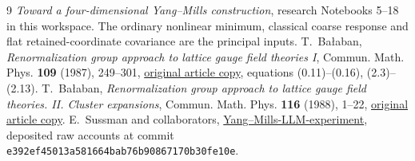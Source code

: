 \documentclass[11pt]{article}
\theoremstyle{remark}
\begin{document}
\begin{thebibliography}{9}
\emph{Toward a four-dimensional Yang--Mills construction},
research Notebooks 5--18 in this workspace. The ordinary nonlinear
minimum, classical coarse response and flat retained-coordinate
covariance are the principal inputs.
T.~Ba\l aban,
\emph{Renormalization group approach to lattice gauge field
theories I}, Commun. Math. Phys. \textbf{109} (1987), 249--301,
\href{https://scispace.com/pdf/renormalization-group-approach-to-lattice-gauge-field-3ygai0vxt1.pdf}{original article copy},
equations (0.11)--(0.16), (2.3)--(2.13).
T.~Ba\l aban,
\emph{Renormalization group approach to lattice gauge field
theories. II. Cluster expansions},
Commun. Math. Phys. \textbf{116} (1988), 1--22,
\href{https://scispace.com/pdf/renormalization-group-approach-to-lattice-gauge-field-4penm4k7hc.pdf}{original article copy}.
E.~Sussman and collaborators,
\href{https://github.com/ethanwsussman/Yang--Mills-LLM-experiment}{Yang--Mills-LLM-experiment},
deposited raw accounts at commit
\texttt{e392ef45013a581664bab76b90867170b30fe10e}.
\end{thebibliography}
\end{document}
